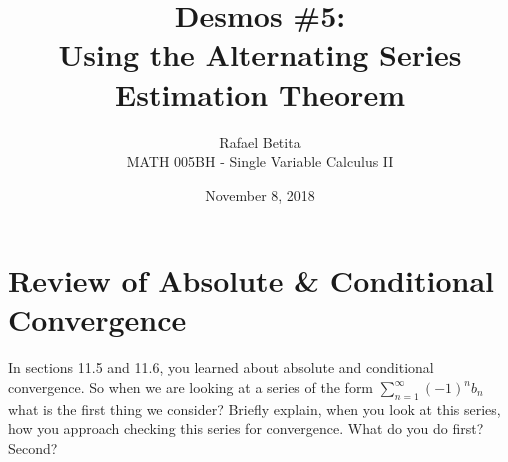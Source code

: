 \documentclass[12pt]{article}
\title{Desmos \#5:
\\Using the Alternating Series
\\Estimation Theorem}
\author{Rafael Betita\\
MATH 005BH - Single Variable Calculus II}
\date{November 8, 2018}
\begin{document}
\maketitle
\newpage
\section{Review of Absolute & Conditional Convergence}
In sections 11.5 and 11.6, you learned about absolute and conditional convergence. So when we are looking at a series of the form $\sum_{n=1}^\infty(-1)^nb_n$ what is the first thing we consider? Briefly explain, when you look at this series, how you approach checking this series for convergence. What do you do first? Second?

\begin{gather*}
    
\end{gather*}
\end{document}
